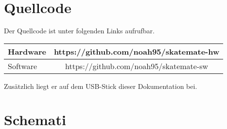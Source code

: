 \section{Quellcode}
Der Quellcode ist unter folgenden Links aufrufbar.
\begin{center}
	\begin{tabular}{l|c}
		\hline 
		Hardware & https://github.com/noah95/skatemate-hw \\ \hline
		Software & https://github.com/noah95/skatemate-sw \\ \hline
	\end{tabular} 
\end{center}

Zusätzlich liegt er auf dem USB-Stick dieser Dokumentation bei.

\section{Schemati}


